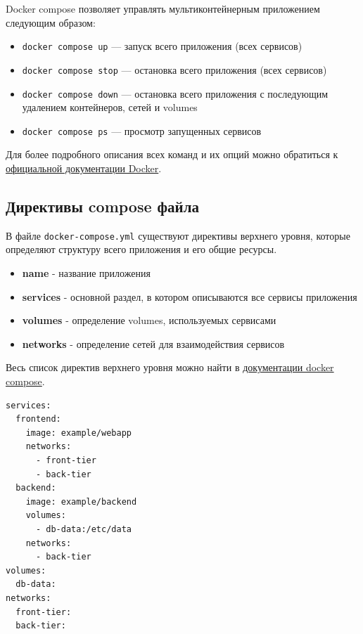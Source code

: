 \documentclass[12pt,a4paper]{article}
\begin{document}
    Docker compose позволяет управлять мультиконтейнерным приложением следующим образом:

    \begin{itemize}
        \item \texttt{docker compose up} — запуск всего приложения (всех сервисов)
        \item \texttt{docker compose stop} — остановка всего приложения (всех сервисов)
        \item \texttt{docker compose down} — остановка всего приложения с последующим удалением контейнеров, сетей и volumes
        \item \texttt{docker compose ps} — просмотр запущенных сервисов
    \end{itemize}

    Для более подробного описания всех команд и их опций можно обратиться к \href{https://docs.docker.com/reference/cli/docker/compose/}{официальной документации Docker}.

    \subsection{Директивы compose файла}

    В файле \texttt{docker-compose.yml} существуют директивы верхнего уровня, которые определяют структуру всего приложения и его общие ресурсы.

    \begin{itemize}
        \item \textbf{name} - название приложения
        \item \textbf{services} - основной раздел, в котором описываются все сервисы приложения
        \item \textbf{volumes} - определение volumes, используемых сервисами
        \item \textbf{networks} - определение сетей для взаимодействия сервисов
    \end{itemize}

    Весь список директив верхнего уровня можно найти в \href{https://docs.docker.com/reference/compose-file/}{документации docker compose}.

    \vspace{0.2cm}

    \begin{lstlisting}[language=docker-compose-2, caption={Пример определения мультиконтейнерного приложения в \mbox{docker-compose.yaml}}, numbers=none, frame=single, basicstyle=\ttfamily\footnotesize, columns=fullflexible, keepspaces=true, breaklines=false, commentstyle=\color{gray}\itshape, extendedchars=true, texcl=true, showstringspaces=false]
services:
  frontend:
    image: example/webapp
    networks:
      - front-tier
      - back-tier
  backend:
    image: example/backend
    volumes:
      - db-data:/etc/data
    networks:
      - back-tier
volumes:
  db-data:
networks:
  front-tier:
  back-tier:
\end{lstlisting}
\end{document}
